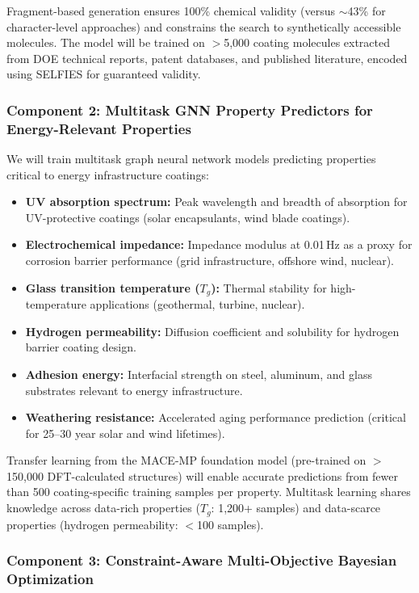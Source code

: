 \documentclass[11pt,letterpaper]{article}
\begin{document}
Fragment-based generation ensures 100\% chemical validity (versus $\sim$43\% for character-level approaches) and constrains the search to synthetically accessible molecules. The model will be trained on $>$5,000 coating molecules extracted from DOE technical reports, patent databases, and published literature, encoded using SELFIES for guaranteed validity.

\subsubsection{Component 2: Multitask GNN Property Predictors for Energy-Relevant Properties}

We will train multitask graph neural network models predicting properties critical to energy infrastructure coatings:

\begin{itemize}[noitemsep]
  \item \textbf{UV absorption spectrum:} Peak wavelength and breadth of absorption for UV-protective coatings (solar encapsulants, wind blade coatings).
  \item \textbf{Electrochemical impedance:} Impedance modulus at 0.01\,Hz as a proxy for corrosion barrier performance (grid infrastructure, offshore wind, nuclear).
  \item \textbf{Glass transition temperature ($T_g$):} Thermal stability for high-temperature applications (geothermal, turbine, nuclear).
  \item \textbf{Hydrogen permeability:} Diffusion coefficient and solubility for hydrogen barrier coating design.
  \item \textbf{Adhesion energy:} Interfacial strength on steel, aluminum, and glass substrates relevant to energy infrastructure.
  \item \textbf{Weathering resistance:} Accelerated aging performance prediction (critical for 25--30 year solar and wind lifetimes).
\end{itemize}

Transfer learning from the MACE-MP foundation model (pre-trained on $>$150,000 DFT-calculated structures) will enable accurate predictions from fewer than 500 coating-specific training samples per property. Multitask learning shares knowledge across data-rich properties ($T_g$: 1,200+ samples) and data-scarce properties (hydrogen permeability: $<$100 samples).

\subsubsection{Component 3: Constraint-Aware Multi-Objective Bayesian Optimization}
\end{document}
